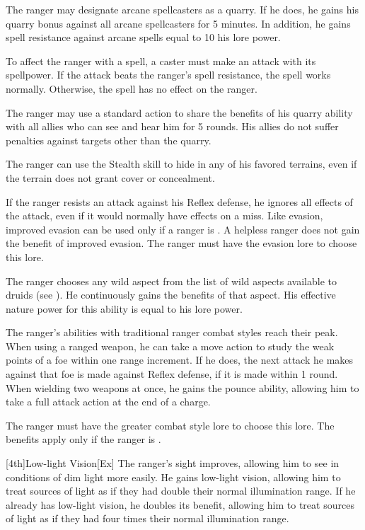 The ranger may designate arcane spellcasters as a quarry.
If he does, he gains his quarry bonus against all arcane spellcasters for 5 minutes.
In addition, he gains spell resistance against arcane spells equal to 10 \add his lore power.

To affect the ranger with a spell, a caster must make an attack with its spellpower.
If the attack beats the ranger's spell resistance, the spell works normally.
Otherwise, the spell has no effect on the ranger.

The ranger may use a standard action to share the benefits of his quarry ability with all allies who can see and hear him for 5 rounds.
His allies do not suffer penalties against targets other than the quarry.

\label{Camouflage}
The ranger can use the Stealth skill to hide in any of his favored terrains, even if the terrain does not grant cover or concealment.

If the ranger resists an attack against his Reflex defense, he ignores all effects of the attack, even if it would normally have effects on a miss.
Like evasion, improved evasion can be used only if a ranger is \unencumbered.
A helpless ranger does not gain the benefit of improved evasion.
The ranger must have the evasion lore to choose this lore.

The ranger chooses any wild aspect from the list of wild aspects available to druids (see ).
He continuously gains the benefits of that aspect.
His effective nature power for this ability is equal to his lore power.

The ranger's abilities with traditional ranger combat styles reach their peak.
When using a ranged weapon, he can take a move action to study the weak points of a foe within one range increment.
If he does, the next attack he makes against that foe is made against Reflex defense, if it is made within 1 round.
When wielding two weapons at once, he gains the pounce ability, allowing him to take a full attack action at the end of a charge.

The ranger must have the greater combat style lore to choose this lore.
The benefits apply only if the ranger is \unencumbered.

[4th]{Low-light Vision}[Ex]
The ranger's sight improves, allowing him to see in conditions of dim light more easily.
He gains low-light vision, allowing him to treat sources of light as if they had double their normal illumination range.
If he already has low-light vision, he doubles its benefit, allowing him to treat sources of light as if they had four times their normal illumination range.

